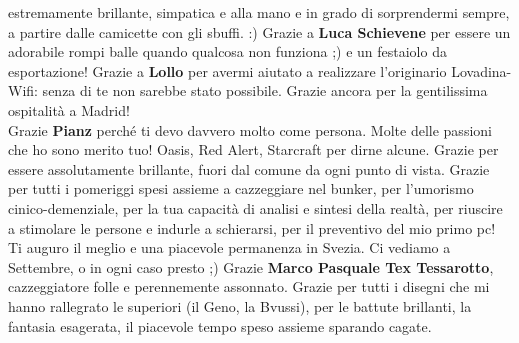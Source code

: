 \documentclass[10pt]{amsart}
\newcommand{\n}[1]{{\Large \bf #1}}
\begin{document}
estremamente brillante, simpatica e alla mano e in grado di sorprendermi sempre, a partire dalle camicette con gli sbuffi. :) Grazie a \n{Luca Schievene} per essere un adorabile rompi balle quando qualcosa non funziona ;) e un festaiolo da esportazione! Grazie a \n{Lollo} per avermi aiutato a realizzare l'originario Lovadina-Wifi: senza di te non sarebbe stato possibile. Grazie ancora per la gentilissima ospitalità a Madrid!\\

Grazie \n{Pianz} perché ti devo davvero molto come persona. Molte delle passioni che ho sono merito tuo! Oasis, Red Alert, Starcraft per dirne alcune. Grazie per essere assolutamente brillante, fuori dal comune da ogni punto di vista. Grazie per tutti i pomeriggi spesi assieme a cazzeggiare nel bunker, per l'umorismo cinico-demenziale, per la tua capacità di analisi e sintesi della realtà, per riuscire a stimolare le persone e indurle a schierarsi, per il preventivo del mio primo pc! Ti auguro il meglio e una piacevole permanenza in Svezia. Ci vediamo a Settembre, o in ogni caso presto ;) 
Grazie \n{Marco Pasquale Tex Tessarotto}, cazzeggiatore folle e perennemente assonnato. Grazie per tutti i disegni che mi hanno rallegrato le superiori (il Geno, la Bvussi), per le battute brillanti, la fantasia esagerata, il piacevole tempo speso assieme sparando cagate.
\end{document}
